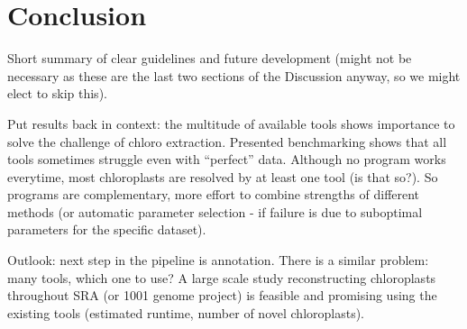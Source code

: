 \documentclass{bmcart}
\begin{document}
\section*{Conclusion}
Short summary of clear guidelines and future development (might not be necessary as these are the last two sections of the Discussion anyway, so we might elect to skip this).

Put results back in context: the multitude of available tools shows importance to solve the challenge of chloro extraction. Presented benchmarking shows that all tools sometimes struggle even with ``perfect'' data. Although no program works everytime, most chloroplasts are resolved by at least one tool (is that so?). So programs are complementary, more effort to combine strengths of different methods (or automatic parameter selection - if failure is due to suboptimal parameters for the specific dataset).

Outlook: next step in the pipeline is annotation. There is a similar problem: many tools, which one to use? 
A large scale study reconstructing chloroplasts throughout SRA (or 1001 genome project) is feasible and promising using the existing tools (estimated runtime, number of novel chloroplasts).

\end{document}
